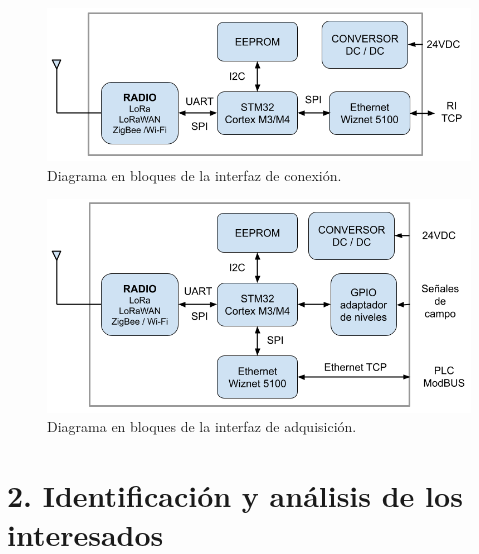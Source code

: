 \documentclass[
11pt, %
]{charter}
\begin{document}
\vspace{5px}

\begin{figure}[htpb]
\centering 
\includegraphics[width=.75\textwidth]{./Figuras/Interfaz_conn.png}
\caption{Diagrama en bloques de la interfaz de conexión.}
\label{fig:diagBloques}
\end{figure}

\vspace{5px}

\begin{figure}[htpb]
\centering 
\includegraphics[width=.75\textwidth]{./Figuras/Interfaz_captura.png}
\caption{Diagrama en bloques de la interfaz de adquisición.}
\label{fig:diagBloques}
\end{figure}

\vspace{25px}







\section{2. Identificación y análisis de los interesados}
\label{sec:interesados}
\end{document}
